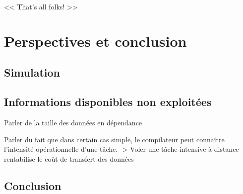 \begin{savequote}[6cm]
<< That's all folks! >>
\end{savequote}

\chapter{Perspectives et conclusion}\label{chap:conclusion}

\section{Simulation}


\section{Informations disponibles non exploitées}


Parler de la taille des données en dépendance

Parler du fait que dans certain cas simple, le compilateur peut connaître l'intensité opérationnelle d'une tâche.
-> Voler une tâche intensive à distance rentabilise le coût de transfert des données

%


\section{Conclusion}
